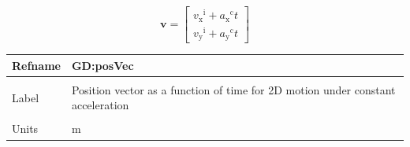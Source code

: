 \documentclass[12pt]{article}
\begin{document}
\begin{displaymath}
\symbf{v}=\begin{bmatrix}
          {{v_{\text{x}}}^{\text{i}}}+{{a_{\text{x}}}^{\text{c}}} t\\
          {{v_{\text{y}}}^{\text{i}}}+{{a_{\text{y}}}^{\text{c}}} t
          \end{bmatrix}
\end{displaymath}
\vspace{\baselineskip}
\noindent
\begin{minipage}{\textwidth}
\begin{tabular}{>{\raggedright}p{}>{\raggedright\arraybackslash}p{}}
\toprule \textbf{Refname} & \textbf{GD:posVec}
\label{GD:posVec}
\\ \midrule \\
Label & Position vector as a function of time for 2D motion under constant acceleration
        
\\ \midrule \\
Units & ${\text{m}}$
        

\end{tabular}
\end{minipage}
\end{document}
